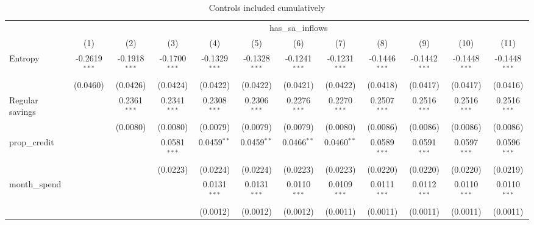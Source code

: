 
\begin{table}[htbp]
   \centering
   \caption{\label{tab:reg_csw0} Controls included cumulatively}
   \begin{tiny}
      \begin{tabular}{lccccccccccc}
         \toprule
          & \multicolumn{11}{c}{has\_sa\_inflows}\\
                                 & (1)             & (2)             & (3)             & (4)             & (5)             & (6)             & (7)             & (8)             & (9)             & (10)            & (11)\\
         \midrule 
         Entropy                 & -0.2619$^{***}$ & -0.1918$^{***}$ & -0.1700$^{***}$ & -0.1329$^{***}$ & -0.1328$^{***}$ & -0.1241$^{***}$ & -0.1231$^{***}$ & -0.1446$^{***}$ & -0.1442$^{***}$ & -0.1448$^{***}$ & -0.1448$^{***}$\\
                                 & (0.0460)        & (0.0426)        & (0.0424)        & (0.0422)        & (0.0422)        & (0.0421)        & (0.0422)        & (0.0418)        & (0.0417)        & (0.0417)        & (0.0416)\\
         Regular savings         &                 & 0.2361$^{***}$  & 0.2341$^{***}$  & 0.2308$^{***}$  & 0.2306$^{***}$  & 0.2276$^{***}$  & 0.2270$^{***}$  & 0.2507$^{***}$  & 0.2516$^{***}$  & 0.2516$^{***}$  & 0.2516$^{***}$\\
                                 &                 & (0.0080)        & (0.0080)        & (0.0079)        & (0.0079)        & (0.0079)        & (0.0080)        & (0.0086)        & (0.0086)        & (0.0086)        & (0.0086)\\
         prop\_credit           &                 &                 & 0.0581$^{***}$  & 0.0459$^{**}$   & 0.0459$^{**}$   & 0.0466$^{**}$   & 0.0460$^{**}$   & 0.0589$^{***}$  & 0.0591$^{***}$  & 0.0597$^{***}$  & 0.0596$^{***}$\\
                                 &                 &                 & (0.0223)        & (0.0224)        & (0.0224)        & (0.0223)        & (0.0223)        & (0.0220)        & (0.0220)        & (0.0220)        & (0.0219)\\
         month\_spend           &                 &                 &                 & 0.0131$^{***}$  & 0.0131$^{***}$  & 0.0110$^{***}$  & 0.0109$^{***}$  & 0.0111$^{***}$  & 0.0112$^{***}$  & 0.0110$^{***}$  & 0.0110$^{***}$\\
                                 &                 &                 &                 & (0.0012)        & (0.0012)        & (0.0012)        & (0.0011)        & (0.0011)        & (0.0011)        & (0.0011)        & (0.0011)\\

\end{tabular}
\end{tiny}
\end{table}
